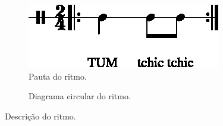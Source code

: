 \begin{figure}[H]
\centering
     \begin{subfigure}[c]{0.45\textwidth}
         \centering
         \includegraphics[width=\textwidth]{chapters/cap-musicalidade-percepcion/treino-ritmo2-1.eps}
         \caption{Pauta do ritmo.}
         \label{fig:RitmoTUMtchictchic1}
     \end{subfigure}
     \hfill
     \begin{subfigure}[c]{0.45\textwidth}
         \centering
{}
         \caption{Diagrama circular do ritmo.}
         \label{fig:RitmoTUMtchictchic2}
     \end{subfigure}
\caption{Descrição do ritmo.}
\label{fig:abc-percepcionritmica2}
\end{figure}

